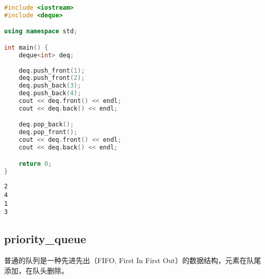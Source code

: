\begin{table}[H]
	\centering
	\caption{deque操作}
\end{table}


\begin{lstlisting}[language=C++]
#include <iostream>
#include <deque>

using namespace std;

int main() {
	deque<int> deq;
	
	deq.push_front(1);
	deq.push_front(2);
	deq.push_back(3);
	deq.push_back(4);
	cout << deq.front() << endl;
	cout << deq.back() << endl;

	deq.pop_back();
	deq.pop_front();
	cout << deq.front() << endl;
	cout << deq.back() << endl;

	return 0;
}
\end{lstlisting}

\begin{tcolorbox}
	\begin{verbatim}
2
4
1
3
	\end{verbatim}
\end{tcolorbox}

\subsection{priority\_queue}

普通的队列是一种先进先出（FIFO, First In First Out）的数据结构，元素在队尾添加，在队头删除。 \\

